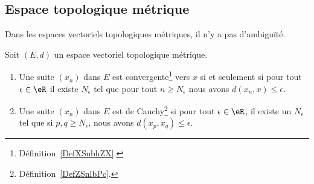\subsection{Espace topologique métrique}

Dans les espaces vectoriels topologiques métriques, il n'y a pas d'ambiguïté.
\begin{proposition}     \label{PropooUEEOooLeIImr}
	Soit \( (E,d)\) un espace vectoriel topologique métrique.
	\begin{enumerate}
		\item   \label{ItemooROYMooAQCXnj}
		      Une suite \( (x_n)\) dans \( E\) est convergente\footnote{Définition~\ref{DefXSnbhZX}.} vers \( x\) si et seulement si pour tout \( \epsilon\in \eR\) il existe \( N_{\epsilon}\) tel que pour tout \( n\geq N_{\epsilon}\) nous avons \( d(x_n,x)\leq \epsilon\).
		\item
		      Une suite \( (x_n)\) dans \( E\) est de Cauchy\footnote{Définition~\ref{DefZSnlbPc}.} si pour tout \( \epsilon\in \eR\), il existe un \( N_{\epsilon}\) tel que si \( p,q\geq N_{\epsilon}\), nous avons \( d(x_p,x_q)\leq \epsilon\).
	\end{enumerate}
\end{proposition}

